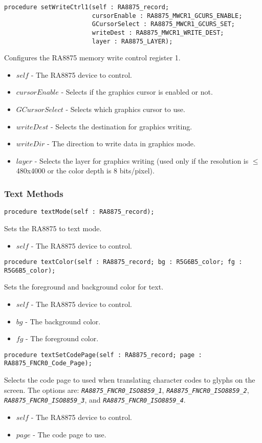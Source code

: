 \documentclass[10pt, openany]{book}
\newcommand{\constant}[1]{\emph{\texttt{#1}}}
\begin{document}
\begin{lstlisting}
procedure setWriteCtrl1(self : RA8875_record;
                        cursorEnable : RA8875_MWCR1_GCURS_ENABLE;
                        GCursorSelect : RA8875_MWCR1_GCURS_SET;
                        writeDest : RA8875_MWCR1_WRITE_DEST;
                        layer : RA8875_LAYER);
\end{lstlisting}
Configures the RA8875 memory write control register 1.
\begin{itemize}
  \item $self$ - The RA8875 device to control.
  \item $cursorEnable$ - Selects if the graphics cursor is enabled or not.
  \item $GCursorSelect$ - Selects which graphics cursor to use.
  \item $writeDest$ - Selects the destination for graphics writing.
  \item $writeDir$ - The direction to write data in graphics mode.
  \item $layer$ - Selects the layer for graphics writing (used only if the resolution is $\le$480x4000 or the color depth is 8 bits/pixel).
\end{itemize}

\subsubsection{Text Methods}
\begin{lstlisting}
procedure textMode(self : RA8875_record);
\end{lstlisting}
Sets the RA8875 to text mode.
\begin{itemize}
  \item $self$ - The RA8875 device to control.
\end{itemize}

\begin{lstlisting}
procedure textColor(self : RA8875_record; bg : R5G6B5_color; fg : R5G6B5_color);
\end{lstlisting}
Sets the foreground and background color for text.
\begin{itemize}
  \item $self$ - The RA8875 device to control.
  \item $bg$ - The background color.
  \item $fg$ - The foreground color.
\end{itemize}

\begin{lstlisting}
procedure textSetCodePage(self : RA8875_record; page : RA8875_FNCR0_Code_Page);
\end{lstlisting}
Selects the code page to used when translating character codes to glyphs on the screen.  The options are: \constant{RA8875\_FNCR0\_ISO8859\_1}, \constant{RA8875\_FNCR0\_ISO8859\_2}, \constant{RA8875\_FNCR0\_ISO8859\_3}, and \constant{RA8875\_FNCR0\_ISO8859\_4}.
\begin{itemize}
  \item $self$ - The RA8875 device to control.
  \item $page$ - The code page to use.
\end{itemize}
\end{document}
